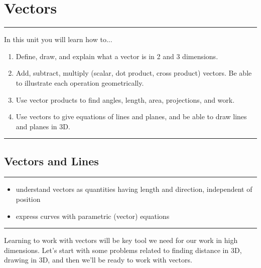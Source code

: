 \documentclass[10pt,]{book}
\theoremstyle{plain}
\theoremstyle{definition}
\theoremstyle{definition}
\theoremstyle{definition}
\theoremstyle{definition}
\newenvironment{objectives}[1]{\noindent\rule{\linewidth}{0.1ex}\newline{\textbf{{\large#1}}\par\smallskip}}{\par\noindent\rule{\linewidth}{0.1ex}\par\smallskip}
\theoremstyle{definition}
\numberwithin{equation}{section}
\begin{document}
\chapter[{Vectors}]{Vectors}\label{ch02_vectors}
\begin{objectives}{Objectives}\label{objectives-2}
In this unit you will learn how to...%
%
\begin{enumerate}
\item\hypertarget{li-15}{}Define, draw, and explain what a vector is in 2 and 3 dimensions.%
\item\hypertarget{li-16}{}Add, subtract, multiply (scalar, dot product, cross product) vectors. Be able to illustrate each operation geometrically.%
\item\hypertarget{li-17}{}Use vector products to find angles, length, area, projections, and work.%
\item\hypertarget{li-18}{}Use vectors to give equations of lines and planes, and be able to draw lines and planes in 3D.%
\end{enumerate}
\end{objectives}
\typeout{************************************************}
\typeout{************************************************}
\section[{Vectors and Lines}]{Vectors and Lines}\label{ch02_1_vectors}
\begin{objectives}{Objectives}\label{objectives-3}
%
\begin{itemize}[label=\textbullet]
\item{}understand vectors as quantities having length and direction, independent of position%
\item{}express curves with parametric (vector) equations%
\end{itemize}
\end{objectives}
Learning to work with vectors will be key tool we need for our work in high dimensions. Let's start with some problems related to finding distance in 3D, drawing in 3D, and then we'll be ready to work with vectors.%
\typeout{************************************************}
\typeout{************************************************}
\end{document}
